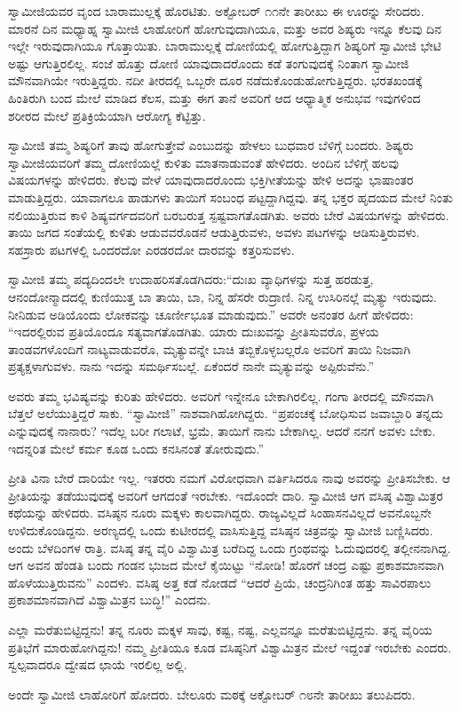 \vskip 2pt

 ಸ್ವಾಮೀಜಿಯವರ ವೃಂದ ಬಾರಾಮುಲ್ಲಕ್ಕೆ ಹೊರಟಿತು. ಅಕ್ಟೋಬರ್ ೧೧ನೇ ತಾರೀಖು ಈ ಊರನ್ನು ಸೇರಿದರು. ಮಾರನೆ ದಿನ ಮಧ್ಯಾಹ್ನ ಸ್ವಾಮೀಜಿ ಲಾಹೋರಿಗೆ ಹೋಗುವುದಾಗಿಯೂ, ಮತ್ತು ಅವರ ಶಿಷ್ಯರು ಇನ್ನೂ ಕೆಲವು ದಿನ ಇಲ್ಲೇ ಇರುವುದಾಗಿಯೂ ಗೊತ್ತಾಯಿತು. ಬಾರಾಮುಲ್ಲಕ್ಕೆ ದೋಣಿಯಲ್ಲಿ ಹೋಗುತ್ತಿದ್ದಾಗ ಶಿಷ್ಯರಿಗೆ ಸ್ವಾಮೀಜಿ ಭೇಟಿ ಅಷ್ಟು ಆಗುತ್ತಿರಲಿಲ್ಲ. ಸಂಜೆ ಹೊತ್ತು ದೋಣಿ ಯಾವುದಾದರೊಂದು ಕಡೆ ತಂಗುವುದಕ್ಕೆ ನಿಂತಾಗ ಸ್ವಾಮೀಜಿ ಮೌನವಾಗಿಯೇ ಇರುತ್ತಿದ್ದರು. ನದೀ ತೀರದಲ್ಲಿ ಒಬ್ಬರೇ ದೂರ ನಡೆದುಕೊಂಡುಹೋಗುತ್ತಿದ್ದರು. ಭರತಖಂಡಕ್ಕೆ ಹಿಂತಿರುಗಿ ಬಂದ ಮೇಲೆ ಮಾಡಿದ ಕೆಲಸ, ಮತ್ತು ಈಗ ತಾನೆ ಅವರಿಗೆ ಆದ ಆಧ್ಯಾತ್ಮಿಕ ಅನುಭವ ಇವುಗಳಿಂದ ಶರೀರದ ಮೇಲೆ ಪ್ರತಿಕ್ರಿಯೆಯಾಗಿ ಆರೋಗ್ಯ ಕೆಟ್ಟಿತ್ತು. 

\vskip 2pt

 ಸ್ವಾಮೀಜಿ ತಮ್ಮ ಶಿಷ್ಯರಿಗೆ ತಾವು ಹೋಗುತ್ತೇವೆ ಎಂಬುದನ್ನು ಹೇಳಲು ಬುಧವಾರ ಬೆಳಿಗ್ಗೆ ಬಂದರು. ಶಿಷ್ಯರು ಸ್ವಾಮೀಜಿಯವರಿಗೆ ತಮ್ಮ ದೋಣಿಯಲ್ಲೆ ಕುಳಿತು ಮಾತನಾಡುವಂತೆ ಹೇಳಿದರು. ಅಂದಿನ ಬೆಳಿಗ್ಗೆ ಹಲವು ವಿಷಯಗಳನ್ನು ಹೇಳಿದರು. ಕೆಲವು ವೇಳೆ ಯಾವುದಾದರೊಂದು ಭಕ್ತಿಗೀತೆಯನ್ನು ಹೇಳಿ ಅದನ್ನು ಭಾಷಾಂತರ ಮಾಡುತ್ತಿದ್ದರು. ಯಾವಾಗಲೂ ಹಾಡುಗಳು ತಾಯಿಗೆ ಸಂಬಂಧ ಪಟ್ಟದ್ದಾಗಿದ್ದವು. ತನ್ನ ಭಕ್ತರ ಹೃದಯದ ಮೇಲೆ ನಿಂತು ನಲಿಯುತ್ತಿರುವ ಕಾಳಿ ಶಿಷ್ಯವರ್ಗದವರಿಗೆ ಬರಬರುತ್ತ ಸ್ಪಷ್ಟವಾಗತೊಡಗಿತು. ಅವರು ಬೇರೆ ವಿಷಯಗಳನ್ನು ಹೇಳಿದರು. ತಾಯಿ ಜಗದ ಸಂತೆಯಲ್ಲಿ ಕುಳಿತು ಆಡುವವರೊಡನೆ ಆಡುತ್ತಿರುವಳು, ಅವಳು ಪಟಗಳನ್ನು ಆಡಿಸುತ್ತಿರುವಳು. ಸಹಸ್ರಾರು ಪಟಗಳಲ್ಲಿ ಒಂದರದೋ ಎರಡರದೋ ದಾರವನ್ನು ಕತ್ತರಿಸುವಳು. 

\vskip 2pt

 ಸ್ವಾಮೀಜಿ ತಮ್ಮ ಪದ್ಯದಿಂದಲೇ ಉದಾಹರಿಸತೊಡಗಿದರು:“ದುಃಖ ವ್ಯಾಧಿಗಳನ್ನು ಸುತ್ತ ಹರಡುತ್ತ, ಆನಂದೋನ್ಮಾದದಲ್ಲಿ ಕುಣಿಯುತ್ತ ಬಾ ತಾಯಿ, ಬಾ, ನಿನ್ನ ಹೆಸರೇ ರುದ್ರಾಣಿ. ನಿನ್ನ ಉಸಿರಿನಲ್ಲೆ ಮೃತ್ಯು ಇರುವುದು. ನೀನಿಡುವ ಅಡಿಯೊಂದು ಲೋಕವನ್ನು ಚೂರ್ಣೀಭೂತ ಮಾಡುವುದು.” ಅವರೇ ಅನಂತರ ಹೀಗೆ ಹೇಳಿದರು: “ಇದರಲ್ಲಿರುವ ಪ್ರತಿಯೊಂದೂ ಸತ್ಯವಾಗತೊಡಗಿತು. ಯಾರು ದುಃಖವನ್ನು ಪ್ರೀತಿಸುವರೊ, ಪ್ರಳಯ ತಾಂಡವಗಳೊಂದಿಗೆ ನಾಟ್ಯವಾಡುವರೊ, ಮೃತ್ಯುವನ್ನೇ ಬಾಚಿ ತಬ್ಬಿಕೊಳ್ಳಬಲ್ಲರೊ ಅವರಿಗೆ ತಾಯಿ ನಿಜವಾಗಿ ಪ್ರತ್ಯಕ್ಷಳಾಗುವಳು. ನಾನು ಇದನ್ನು ಸಮರ್ಥಿಸಬಲ್ಲೆ. ಏಕೆಂದರೆ ನಾನೇ ಮೃತ್ಯುವನ್ನು ಅಪ್ಪಿರುವೆನು.” 

 ಅವರು ತಮ್ಮ ಭವಿಷ್ಯವನ್ನು ಕುರಿತು ಹೇಳಿದರು. ಅವರಿಗೆ ಇನ್ನೇನೂ ಬೇಕಾಗಿರಲಿಲ್ಲ. ಗಂಗಾ ತೀರದಲ್ಲಿ ಮೌನವಾಗಿ ಬೆತ್ತಲೆ ಅಲೆಯುತ್ತಿದ್ದರೆ ಸಾಕು. “ಸ್ವಾಮೀಜಿ” ನಾಶವಾಗಿಹೋಗಿದ್ದರು. “ಪ್ರಪಂಚಕ್ಕೆ ಬೋಧಿಸುವ ಜವಾಬ್ದಾರಿ ತನ್ನದು ಎನ್ನುವುದಕ್ಕೆ ನಾನಾರು? ಇದೆಲ್ಲ ಬರೀ ಗಲಾಟೆ, ಭ್ರಮೆ, ತಾಯಿಗೆ ನಾನು ಬೇಕಾಗಿಲ್ಲ. ಆದರೆ ನನಗೆ ಅವಳು ಬೇಕು. ಇದನ್ನರಿತ ಮೇಲೆ ಕರ್ಮ ಕೂಡ ಒಂದು ಕನಸಿನಂತೆ ತೋರುವುದು.” 

 ಪ್ರೀತಿ ವಿನಾ ಬೇರೆ ದಾರಿಯೇ ಇಲ್ಲ. ಇತರರು ನಮಗೆ ವಿರೋಧವಾಗಿ ವರ್ತಿಸಿದರೂ ನಾವು ಅವರನ್ನು ಪ್ರೀತಿಸಬೇಕು. ಆ ಪ್ರೀತಿಯನ್ನು ತಡೆಯುವುದಕ್ಕೆ ಅವರಿಗೆ ಆಗದಂತೆ ಇರಬೇಕು. ಇದೊಂದೇ ದಾರಿ. ಸ್ವಾಮೀಜಿ ಆಗ ವಸಿಷ್ಠ ವಿಶ್ವಾಮಿತ್ರರ ಕಥೆಯನ್ನು ಹೇಳಿದರು. ವಸಿಷ್ಠನ ನೂರು ಮಕ್ಕಳು ಕಾಲವಾಗಿದ್ದರು. ರಾಜ್ಯವಿಲ್ಲದೆ ಸಿಂಹಾಸನವಿಲ್ಲದೆ ಅವನೊಬ್ಬನೇ ಉಳಿದುಕೊಂಡಿದ್ದನು. ಅರಣ್ಯದಲ್ಲಿ ಒಂದು ಕುಟೀರದಲ್ಲಿ ವಾಸಿಸುತ್ತಿದ್ದ ವಸಿಷ್ಠನ ಚಿತ್ರವನ್ನು ಸ್ವಾಮೀಜಿ ಬಣ್ಣಿಸಿದರು. ಅಂದು ಬೆಳದಿಂಗಳ ರಾತ್ರಿ. ವಸಿಷ್ಠ ತನ್ನ ವೈರಿ ವಿಶ್ವಾಮಿತ್ರ ಬರೆದಿದ್ದ ಒಂದು ಗ್ರಂಥವನ್ನು ಓದುವುದರಲ್ಲಿ ತಲ್ಲೀನನಾಗಿದ್ದ. ಆಗ ಅವನ ಹೆಂಡತಿ ಬಂದು ಗಂಡನ ಭುಜದ ಮೇಲೆ ಕೈಯಿಟ್ಟು “ನೋಡಿ! ಹೊರಗೆ ಚಂದ್ರ ಎಷ್ಟು ಪ್ರಕಾಶಮಾನವಾಗಿ ಹೊಳೆಯುತ್ತಿರುವನು” ಎಂದಳು. ವಸಿಷ್ಠ ಅತ್ತ ಕಡೆ ನೋಡದೆ “ಆದರೆ ಪ್ರಿಯೆ, ಚಂದ್ರನಿಗಿಂತ ಹತ್ತು ಸಾವಿರಪಾಲು ಪ್ರಕಾಶಮಾನವಾಗಿದೆ ವಿಶ್ವಾಮಿತ್ರನ ಬುದ್ಧಿ!” ಎಂದನು. 

 ಎಲ್ಲಾ ಮರೆತುಬಿಟ್ಟಿದ್ದನು! ತನ್ನ ನೂರು ಮಕ್ಕಳ ಸಾವು, ಕಷ್ಟ, ನಷ್ಟ, ಎಲ್ಲವನ್ನೂ ಮರೆತುಬಿಟ್ಟಿದ್ದನು. ತನ್ನ ವೈರಿಯ ಪ್ರತಿಭೆಗೆ ಮಾರುಹೋಗಿದ್ದನು! ನಮ್ಮ ಪ್ರೀತಿಯೂ ಕೂಡ ವಸಿಷ್ಠನಿಗೆ ವಿಶ್ವಾಮಿತ್ರನ ಮೇಲೆ ಇದ್ದಂತೆ ಇರಬೇಕು ಎಂದರು. ಸ್ವಲ್ಪವಾದರೂ ದ್ವೇಷದ ಛಾಯೆ ಇರಲಿಲ್ಲ ಅಲ್ಲಿ. 

 ಅಂದೇ ಸ್ವಾಮೀಜಿ ಲಾಹೋರಿಗೆ ಹೋದರು. ಬೇಲೂರು ಮಠಕ್ಕೆ ಅಕ್ಟೋಬರ್ ೧೮ನೇ ತಾರೀಖು ತಲುಪಿದರು. 

